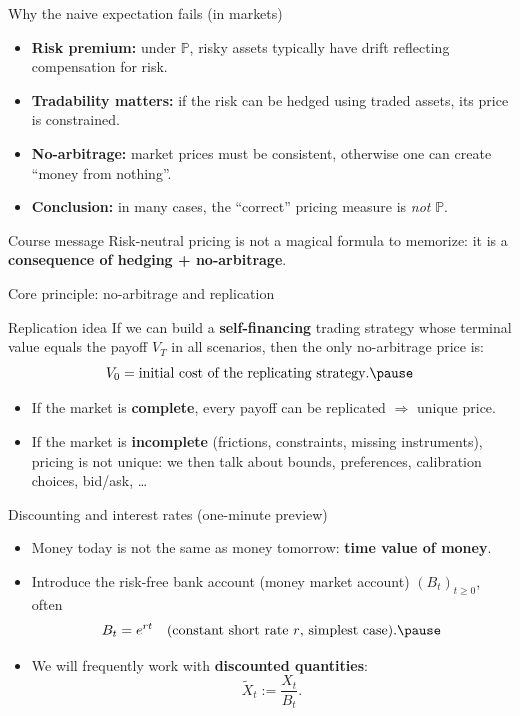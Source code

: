 \documentclass[10pt,aspectratio=169]{beamer}
\begin{document}
\begin{frame}{Why the naive expectation fails (in markets)}
\begin{itemize}
  \item \textbf{Risk premium:} under $\mathbb{P}$, risky assets typically have drift reflecting compensation for risk.\pause
  \item \textbf{Tradability matters:} if the risk can be hedged using traded assets, its price is constrained.\pause
  \item \textbf{No-arbitrage:} market prices must be consistent, otherwise one can create ``money from nothing''.\pause
  \item \textbf{Conclusion:} in many cases, the ``correct'' pricing measure is \emph{not} $\mathbb{P}$.
\end{itemize}

\medskip
\begin{block}{Course message}
Risk-neutral pricing is not a magical formula to memorize: it is a \textbf{consequence of hedging + no-arbitrage}.
\end{block}
\end{frame}

\begin{frame}{Core principle: no-arbitrage and replication}
\begin{block}{Replication idea}
If we can build a \textbf{self-financing} trading strategy whose terminal value equals the payoff $V_T$ in all scenarios,
then the only no-arbitrage price is:
\[
V_0 = \text{initial cost of the replicating strategy}.\pause
\]
\end{block}

\medskip
\begin{itemize}
  \item If the market is \textbf{complete}, every payoff can be replicated $\Rightarrow$ unique price.\pause
  \item If the market is \textbf{incomplete} (frictions, constraints, missing instruments), pricing is not unique:
  we then talk about bounds, preferences, calibration choices, bid/ask, \dots
\end{itemize}
\end{frame}

\begin{frame}{Discounting and interest rates (one-minute preview)}
\begin{itemize}
  \item Money today is not the same as money tomorrow: \textbf{time value of money}.\pause
  \item Introduce the risk-free bank account (money market account) $(B_t)_{t\ge 0}$, often
  \[
  B_t = e^{rt} \quad \text{(constant short rate $r$, simplest case).}\pause
  \]
  \item We will frequently work with \textbf{discounted quantities}:
  \[
  \tilde{X}_t := \frac{X_t}{B_t}.
  \]
\end{itemize}
\end{frame}
\end{document}
